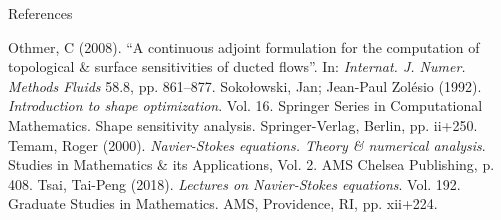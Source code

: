\documentclass[10pt
hyperref={
    pdfauthor={Hong Quan Ba Nguyen},
    pdftitle={Optimal Shape Design of Air Ducts in Combustion Engines: Design a General Framework},
    pdfsubject={Talk},
    pdfcreator={LaTeX},
}
]{beamer}
\begin{document}
\begin{frame}{References}
    \begin{thebibliography}{99}        
         Othmer, C (2008). ``A continuous adjoint formulation for the computation of topological {\small\&} surface sensitivities of ducted flows''. In: \textit{Internat. J. Numer. Methods Fluids} 58.8, pp. 861--877.
         Soko\l owski, Jan; Jean-Paul Zol\'esio (1992). \textit{Introduction to shape optimization}. Vol. 16. Springer Series in Computational Mathematics. Shape sensitivity analysis. Springer-Verlag, Berlin, pp. ii+250.
         Temam, Roger (2000). \textit{Navier-Stokes equations. Theory {\small\&} numerical analysis}. Studies in Mathematics {\small\&} its Applications, Vol. 2. AMS Chelsea Publishing, p. 408.
         Tsai, Tai-Peng (2018). \textit{Lectures on Navier-Stokes equations}. Vol. 192. Graduate Studies in Mathematics. AMS, Providence, RI, pp. xii+224. 
    \end{thebibliography}
\end{frame}
    
\end{document}
